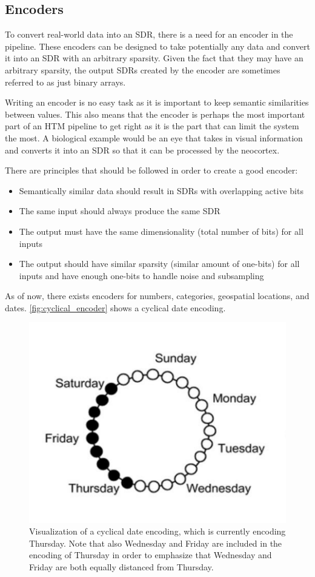 \subsection{Encoders}
\label{sec:encoders}
To convert real-world data into an SDR, there is a need for an encoder in the pipeline. These encoders can be designed to take potentially any data and convert it into an SDR with an arbitrary sparsity. Given the fact that they may have an arbitrary sparsity, the output SDRs created by the encoder are sometimes referred to as just binary arrays.\par
Writing an encoder is no easy task as it is important to keep semantic similarities between values. This also means that the encoder is perhaps the most important part of an HTM pipeline to get right as it is the part that can limit the system the most. A biological example would be an eye that takes in visual information and converts it into an SDR so that it can be processed by the neocortex.
\par
There are principles that should be followed in order to create a good encoder:
\begin{itemize}
    \item Semantically similar data should result in SDRs with overlapping active bits
    \item The same input should always produce the same SDR
    \item The output must have the same dimensionality (total number of bits) for all inputs
    \item The output should have similar sparsity (similar amount of one-bits) for all inputs and have enough one-bits to handle noise and subsampling
\end{itemize}
As of now, there exists encoders for numbers, categories, geospatial locations, and dates. \autoref{fig:cyclical_encoder} shows a cyclical date encoding.
\begin{figure}[H]
    \centering
    \includegraphics[width=0.9\linewidth]{resources/related_works/cyclical_encoder}
    \caption[Cyclical Date Encoding]{Visualization of a cyclical date encoding, which is currently encoding Thursday. Note that also Wednesday and Friday are included in the encoding of Thursday in order to emphasize that Wednesday and Friday are both equally distanced from Thursday.}
    \label{fig:cyclical_encoder}
\end{figure}
